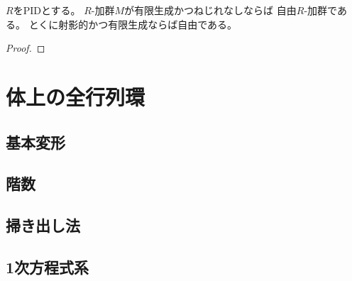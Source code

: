 \documentclass[report]{jlreq}
\begin{document}
\begin{corollary}
    $R$をPIDとする。
    $R$-加群$M$が有限生成かつねじれなしならば
    自由$R$-加群である。
    とくに射影的かつ有限生成ならば自由である。
\end{corollary}

\begin{theorem}[準素分解]
    \TODO{}
\end{theorem}

\begin{proof}
    \TODO{}
\end{proof}



%
\chapter{体上の全行列環}

%
\section{基本変形}


%
\section{階数}

\TODO{}

%
\section{掃き出し法}


%
\section{1次方程式系}
\end{document}
